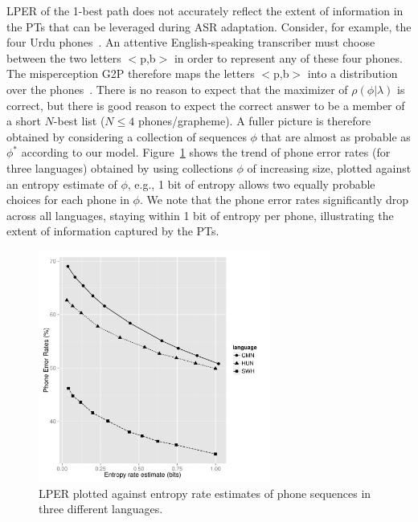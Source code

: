
LPER of the 1-best path does not
accurately reflect the extent of information in the PTs that can be
leveraged during ASR adaptation.  Consider, for example, the four
Urdu phones~\ipa{[p,p\textsuperscript{h},b,\"*b]}.  An attentive
English-speaking transcriber must choose between the two letters
$<$p,b$>$ in order to represent any of these four phones.  The
misperception G2P therefore maps the letters $<$p,b$>$ into a
distribution over the phones~\ipa{[p,p\textsuperscript{h},b,\"*b]}.
There is no reason to expect that the maximizer of
$\rho(\phi|\lambda)$ is correct, but there is good reason to expect
the correct answer to be a member of a short $N$-best list ($N\le 4$
phones/grapheme).  A fuller picture is therefore obtained by
considering a collection of sequences $\phi$ that are almost as
probable as $\phi^*$ according to our model. Figure~\ref{fig:listPER}
shows the trend of phone error rates (for three languages) obtained by
using collections $\phi$ of increasing size, plotted against an
entropy estimate of $\phi$, e.g., 1 bit of entropy allows two equally
probable choices for each phone in $\phi$. We note that the phone
error rates significantly drop across all languages, staying within 1
bit of entropy per phone, illustrating the extent of information
captured by the PTs.

\begin{figure}[t!]
\begin{center}
\includegraphics[width=3in]{../figs/perfig.pdf}
\end{center}
\caption{LPER plotted against entropy rate estimates of phone sequences in three different languages.}
\label{fig:listPER}
\end{figure}

